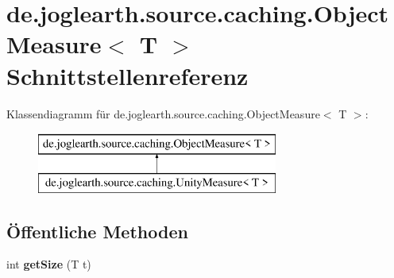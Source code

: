 \section{de.\-joglearth.\-source.\-caching.\-Object\-Measure$<$ T $>$ Schnittstellenreferenz}
\label{interfacede_1_1joglearth_1_1source_1_1caching_1_1_object_measure_3_01_t_01_4}
Klassendiagramm für de.\-joglearth.\-source.\-caching.\-Object\-Measure$<$ T $>$\-:\begin{figure}[H]
\begin{center}
\leavevmode
\includegraphics[height=2.000000cm]{interfacede_1_1joglearth_1_1source_1_1caching_1_1_object_measure_3_01_t_01_4}
\end{center}
\end{figure}
\subsection*{Öffentliche Methoden}
\begin{DoxyCompactItemize}
\item 
int {\bfseries get\-Size} (T t)\label{interfacede_1_1joglearth_1_1source_1_1caching_1_1_object_measure_3_01_t_01_4_a34c0babb0e34fe5e11301b5e8b7796b7}

\end{DoxyCompactItemize}
